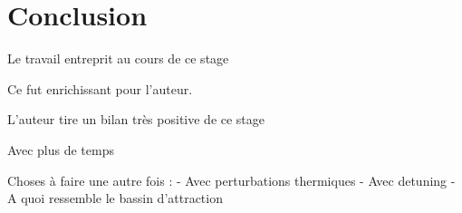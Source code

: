 \chapter{Conclusion}
%
Le travail entreprit au cours de ce stage

Ce fut enrichissant pour l'auteur.

L'auteur tire un bilan très positive de ce stage


Avec plus de temps

Choses à faire une autre fois :
- Avec perturbations thermiques
- Avec detuning
- A quoi ressemble le bassin d'attraction